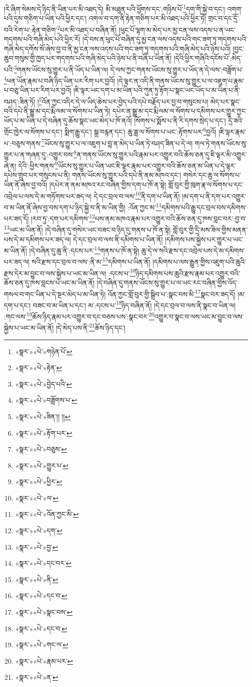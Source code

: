 །རེ་ཞིག་སེམས་དེ་ཉིད་ནི་ཡིན་པར་མི་འཐད་དེ། མི་མཐུན་པའི་ཕྱོགས་དང་:གཉིས་པོ་\footnote{«སྣར་»«པེ་»གཉེན་པོ་}དག་གི་སྐྱེ་བ་དང་། འགག་པའི་དུས་གཅིག་པ་ཡིན་པའི་ཕྱིར་དང་། འགལ་བ་དག་ནི་རྟེན་གཅིག་པར་མི་འཐད་པའི་ཕྱིར་ཏེ། གྲང་བ་དང་དྲོ་བའི་རེག་པ་:རྟེན་གཅིག་\footnote{«སྣར་»«པེ་»རྟེན་}པར་མི་འཐད་པ་བཞིན་ནོ། །ཕུང་པོ་ལྷག་མ་མེད་པར་མྱ་ངན་ལས་འདས་པ་ན་ཡང་གདགས་པའི་གཞི་མེད་པའི་ཕྱིར་རོ། །དེ་བས་ན་ཕུང་པོ་བཞིན་དུ་མྱ་ངན་ལས་འདས་པའི་གང་ཟག་ཏུ་གདགས་པའི་གཞི་མེད་དགོས་སོ་ཞེས་བྱ་བ་ནི་མྱ་ངན་ལས་འདས་པའི་གང་ཟག་ཏུ་གདགས་པའི་གཞི་མེད་པའི་ཉེས་པའོ། །བྱང་ཆུབ་གསུམ་གྱི་ཁྱད་པར་གདགས་པའི་གཞི་མེད་པའི་ཉེས་པ་ནི་བཞི་པ་ཡིན་ནོ། །དེའི་ཕྱིར་གཞིའི་དངོས་པོ་:མེད་པའི་\footnote{«སྣར་»«པེ་»བྱེད་པའི་}གནས་ཡོངས་སུ་གྱུར་པ་ནི་ཡོད་པ་ཡིན་ལ། དེ་ལས་ཀྱང་གནས་ཡོངས་སུ་གྱུར་པ་ཡོད་ན་དེ་ལས་:བཟློག་པ་\footnote{«སྣར་»«པེ་»བཟློགས་པ་}ཕན་ཡོན་རྣམ་པ་བཞི་ཉིད་ཡིན་པར་རིག་པར་བྱའོ། །དེ་ལྟར་ན་འདི་ནི་གནས་ཡོངས་སུ་གྱུར་པ་ལ་འཇུག་པ་རྣམ་པ་བཅུ་ཡིན་པར་རིག་པར་བྱའོ། །ཇི་ལྟར་ཡང་དག་པ་མ་ཡིན་པའི་ཀུན་ཏུ་རྟོག་པ་སྣང་ཡང་ཡོད་པ་མ་ཡིན་པ་ནི་བཤད་:ཟིན་ཏོ། །\footnote{«སྣར་»«པེ་»ཟིན་།། །།}འོན་ཀྱང་འདིར་དེ་ལ་ཡིད་ཆེས་པར་བྱེད་པའི་དཔེ་བརྗོད་པར་བྱ་བ་གསུངས་པ། མེད་པར་སྣང་བའི་དཔེ་ནི་སྒྱུ་མ་དང་རྨི་ལམ་ལ་སོགས་པ་ཡིན་ཏེ། དཔེར་ན་སྒྱུ་མ་དང་རྨི་ལམ་ལ་སོགས་པ་དམིགས་པར་གྱུར་ཀྱང་ཡོད་པ་མ་ཡིན་པ་དེ་བཞིན་དུ་ཆོས་སྣང་ཡང་མེད་པ་ཁོ་ནའོ། །སོགས་པ་སྨོས་པ་ནི་རི་དགས་སྲེད་པ་དང་། དྲི་ཟའི་གྲོང་ཁྱེར་ལ་སོགས་པ་དང་། སྨིག་རྒྱུ་དང་། སྒྲ་བརྙན་དང་། ཆུ་ཟླ་ལ་སོགས་པ་ཡང་:རྟོགས་པར་\footnote{«སྣར་»«པེ་»རྟོག་པར་}བྱའོ། །ཇི་ལྟར་རྣམ་པ་:བཅུས་གནས་\footnote{«སྣར་»«པེ་»བཅུས་}ཡོངས་སུ་གྱུར་པ་ལ་འཇུག་པ་བླ་ན་མེད་པ་ཡིན་ཏེ་བཤད་ཟིན་པ་དེ་ལ། གལ་ཏེ་གནས་ཡོངས་སུ་གྱུར་པ་ན་གཞན་དུ་:འགྱུར་བས་\footnote{«སྣར་»«པེ་»གྱུར་པ་}ན་གནས་ཡོངས་སུ་གྱུར་པའི་རྣམ་པར་འགྱུར་བའི་ཆོས་ཅན་དུ་ཇི་ལྟར་མི་འགྱུར་ཞེ་ན། དེའི་:ཕྱིར་གནས་\footnote{«སྣར་»«པེ་»ཕྱིར་}ཡོངས་སུ་གྱུར་པ་ཡིན་ཡང་ཇི་ལྟར་རྣམ་པར་འགྱུར་བའི་ཆོས་ཅན་མ་ཡིན་པ་དེ་ལྟར་དཔེས་གྲུབ་པར་གསུངས་པ་ནི། གནས་ཡོངས་སུ་གྱུར་པའི་དཔེ་ནི་ནམ་མཁའ་དང་། གསེར་དང་ཆུ་ལ་སོགས་པ་ཡིན་ནོ་ཞེས་བྱ་བའོ། །དཔེར་ན་ནམ་མཁའ་རང་བཞིན་གྱིས་དག་པ་ཁོ་ན་སྟེ། གློ་བུར་གྱི་ཁུག་རྣ་ལ་སོགས་པ་དང་འབྲེལ་པ་ལས་དེ་མ་གཏོགས་པར་ཟད་ལ། དེ་དང་བྲལ་བ་ལས་\footnote{«སྣར་»«པེ་»ལ་}ནི་དག་པ་ཡིན་ནོ། །མ་དག་པ་ནི་དག་པར་འགྱུར་བ་མ་ཡིན་ནོ་ཞེས་བྱ་བས་དག་པ་ཉིད་སྐྱེ་བ་ནི་མ་ཡིན་གྱི། :འོན་ཀྱང་མ་\footnote{«སྣར་»«པེ་»འོན་ཀྱང་མི་}དམིགས་པའི་རྒྱུ་དང་བྲལ་བས་དམིགས་པར་ཟད་དོ། །རབ་ཏུ་:དག་པར་དམིགས་\footnote{«སྣར་»«པེ་»དག་}པས་ནམ་མཁའ་རྣམ་པར་འགྱུར་བའི་ཆོས་ཅན་དུ་ཁས་བླང་བར་:བྱ་བ་\footnote{«སྣར་»«པེ་»བྱ་}ཡང་མ་ཡིན་ནོ། །དེ་བཞིན་དུ་གསེར་ཡང་བཟང་བ་ཉིད་དུ་གནས་པ་ཁོ་ན་སྟེ། གློ་བུར་གྱི་དྲི་མས་ཟིལ་གྱིས་མནན་པས་དེ་མ་དམིགས་པར་ཟད་ལ། དེ་དང་བྲལ་བ་ལས་ནི་དམིགས་པ་ཡིན་ནོ། །དམིགས་པས་སྐྱེས་པར་གྱུར་པ་ཡང་མ་ཡིན་ནོ། །དེ་བཞིན་དུ་ཆུ་ནི་:དངས་པར་\footnote{«སྣར་»«པེ་»དང་བར་}གནས་པ་ཁོ་ན་སྟེ། ཆུ་དེ་ལ་སའི་རྫས་དང་འབྲེལ་པས་དེ་མ་དམིགས་པར་ཟད་ལ། སའི་རྫས་དང་བྲལ་བ་ལས་:ནི་མ་\footnote{«སྣར་»«པེ་»ནི་}དམིགས་པ་ཡིན་ནོ། །དམིགས་པ་ལས་རྒྱུན་གྱིས་འཇུག་པའི་ཆུའི་རྫས་དེར་མ་བྱུང་བ་ལས་སྐྱེས་པ་ཡང་མ་ཡིན་ལ། :དངས་པ་\footnote{«སྣར་»«པེ་»དང་བ་}ཉིད་དམིགས་པས་ཆུའི་རྫས་རྣམ་པར་འགྱུར་བའི་ཆོས་ཅན་དུ་ཁས་བླངས་པ་ཡང་མ་ཡིན་ནོ། །དེ་བཞིན་དུ་གནས་ཡོངས་སུ་གྱུར་པ་ལ་ཡང་རང་བཞིན་གྱིས་འོད་གསལ་བ་གང་ཡིན་པ་དེ་སྔར་མེད་པ་མ་ཡིན་ཏེ། འོན་ཀྱང་གློ་བུར་གྱི་སྒྲིབ་པ་:སྣང་བས་མི་\footnote{«སྣར་»«པེ་»སྣང་བས་}སྣང་བར་ཟད་དོ། །མ་དག་པ་དང་། བཟང་བ་མ་ཡིན་པ་དང་། མ་:དངས་པ་\footnote{«སྣར་»«པེ་»དང་བ་}ཉིད་བཞིན་ནོ། །དེ་དང་བྲལ་བ་ལས་ནི་སྣང་བ་ཡིན་ལ། :གང་ལས་\footnote{«སྣར་»«པེ་»གང་ལ་}ཆོས་ཉིད་རྣམ་པར་འགྱུར་བ་དང་བཅས་པས་:སྣང་བར་\footnote{«སྣར་»«པེ་»རྣམ་པར་}འགྱུར་བ་སྣང་བ་ལས་ཡང་མ་བྱུང་བ་ལས་སྐྱེས་པ་ཡང་མ་ཡིན་ནོ། །དེ་མེད་པས་ནི་\footnote{«སྣར་»«པེ་»ན་}ཆོས་ཉིད་དང་། 